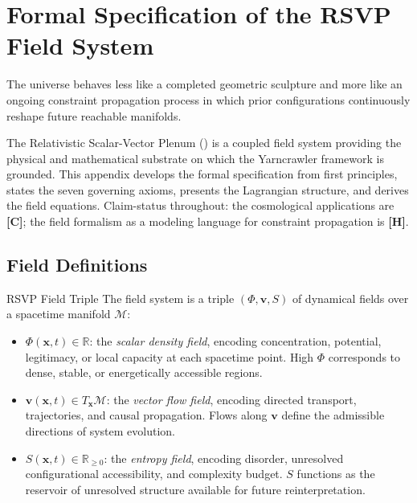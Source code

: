 \chapter{Formal Specification of the RSVP Field System}
\label{app:rsvp}

\epigraph{The universe behaves less like a completed geometric sculpture and more
like an ongoing constraint propagation process in which prior configurations
continuously reshape future reachable manifolds.}{}

\noindent The Relativistic Scalar-Vector Plenum (\RSVP) is a coupled field system
providing the physical and mathematical substrate on which the Yarncrawler framework
is grounded. This appendix develops the formal specification from first principles,
states the seven governing axioms, presents the Lagrangian structure, and derives
the field equations. Claim-status throughout: the cosmological applications are
\textbf{[C]}; the field formalism as a modeling language for constraint propagation
is \textbf{[H]}.

\section{Field Definitions}

\begin{definition}{RSVP Field Triple}
The \RSVP field system is a triple $(\Phi, \mathbf{v}, S)$ of dynamical fields
over a spacetime manifold $\mathcal{M}$:
\begin{itemize}
  \item $\Phi(\mathbf{x},t) \in \mathbb{R}$: the \emph{scalar density field},
    encoding concentration, potential, legitimacy, or local capacity at each
    spacetime point. High $\Phi$ corresponds to dense, stable, or energetically
    accessible regions.
  \item $\mathbf{v}(\mathbf{x},t) \in T_\mathbf{x}\mathcal{M}$: the \emph{vector
    flow field}, encoding directed transport, trajectories, and causal propagation.
    Flows along $\mathbf{v}$ define the admissible directions of system evolution.
  \item $S(\mathbf{x},t) \in \mathbb{R}_{\geq 0}$: the \emph{entropy field},
    encoding disorder, unresolved configurational accessibility, and complexity
    budget. $S$ functions as the reservoir of unresolved structure available for
    future reinterpretation.
\end{itemize}
\end{definition}

